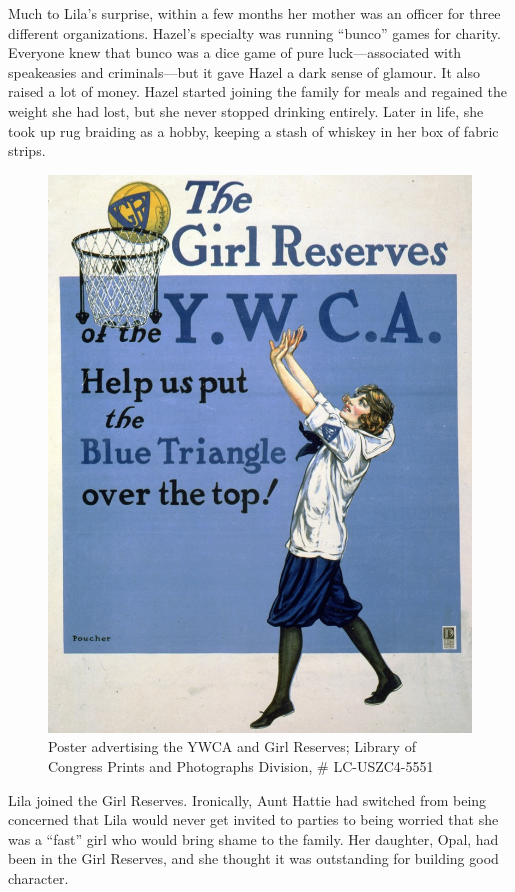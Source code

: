 \documentclass[
  letterpaper,
]{book}
\begin{document}
Much to Lila's surprise, within a few months her mother was an officer
for three different organizations. Hazel's specialty was running
``bunco'' games for charity. Everyone knew that bunco was a dice game of
pure luck---associated with speakeasies and criminals---but it gave
Hazel a dark sense of glamour. It also raised a lot of money. Hazel
started joining the family for meals and regained the weight she had
lost, but she never stopped drinking entirely. Later in life, she took
up rug braiding as a hobby, keeping a stash of whiskey in her box of
fabric strips.

\begin{figure}[H]

{\centering \includegraphics[width=0.75\linewidth,height=\textheight,keepaspectratio]{images/Akou10recropped.jpg}

}

\caption[Poster advertising the YWCA and Girl Reserves]{Poster
advertising the YWCA and Girl Reserves; Library of Congress Prints and
Photographs Division, \# LC-USZC4-5551}

\end{figure}%

Lila joined the Girl Reserves. Ironically, Aunt Hattie had switched from
being concerned that Lila would never get invited to parties to being
worried that she was a ``fast'' girl who would bring shame to the
family. Her daughter, Opal, had been in the Girl Reserves, and she
thought it was outstanding for building good character.
\end{document}
